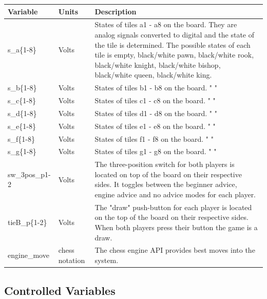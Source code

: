 \documentclass[12pt]{article}
\begin{document}
\begin{table}[H]
  \centering
      \setlength{\leftmargini}{0.4cm}
      \begin{tabular}{| >{\centering\arraybackslash}m{2.5cm} | 
        >{\centering\arraybackslash}m{2cm} | 
        >{\centering\arraybackslash}m{9cm} |}
      \hline
      \rowcolor[gray]{0.9}
      Variable & Units & Description\\
      \hline
      s\_a\{1-8\} & Volts & States of tiles a1 - a8 on the board. They are analog signals 
      converted to digital and the state of the tile is determined. The possible states of 
      each tile is empty, black/white pawn, black/white rook, black/white knight, 
      black/white bishop, black/white queen, black/white king. \\
      \hline
      s\_b\{1-8\} & Volts & States of tiles b1 - b8 on the board. " " \\
      \hline
      s\_c\{1-8\} & Volts & States of tiles c1 - c8 on the board. " " \\
      \hline
      s\_d\{1-8\} & Volts & States of tiles d1 - d8 on the board. " " \\
      \hline
      s\_e\{1-8\} & Volts & States of tiles e1 - e8 on the board. " " \\
      \hline
      s\_f\{1-8\} & Volts & States of tiles f1 - f8 on the board. " " \\
      \hline
      s\_g\{1-8\} & Volts & States of tiles g1 - g8 on the board. " " \\
      \hline
      sw\_3pos\_p{1-2} & Volts & The three-position switch for both players is located
      on top of the board on their respective sides. It toggles between the beginner 
      advice, engine advice and no advice modes for each player.\\
      \hline
      tieB\_p\{1-2\} & Volts & The "draw" push-button for each player is located on 
      the top of the board on their respective sides. When both players press their button
      the game is a draw. \\
      \hline
      engine\_move & chess notation & The chess engine API provides best moves into 
      the system. \\
      \hline 
      \end{tabular}
  \label{Table}
  \end{table}

\subsection{Controlled Variables}
\end{document}
